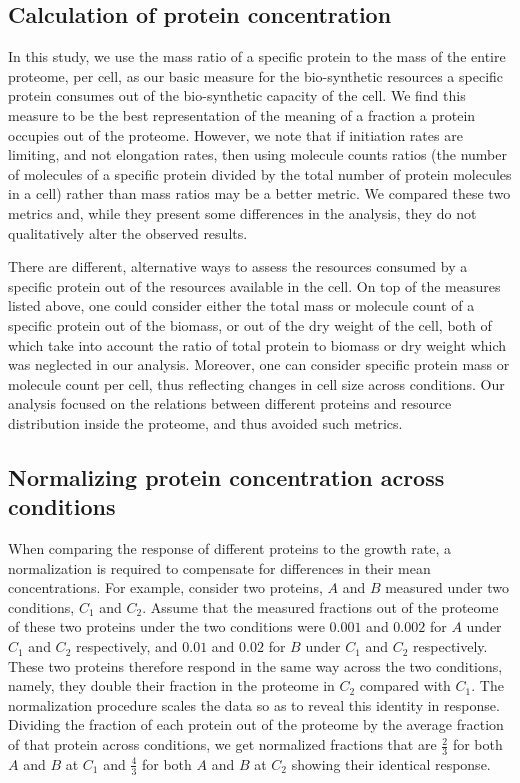 \documentclass[notitlepage]{article}
\begin{document}
\subsection{Calculation of protein concentration}
\label{protconc}
In this study, we use the mass ratio of a specific protein to the mass of the entire proteome, per cell, as our basic measure for the bio-synthetic resources a specific protein consumes out of the bio-synthetic capacity of the cell.
We find this measure to be the best representation of the meaning of a fraction a protein occupies out of the proteome.
However, we note that if initiation rates are limiting, and not elongation rates, then using molecule counts ratios (the number of molecules of a specific protein divided by the total number of protein molecules in a cell) rather than mass ratios may be a better metric.
We compared these two metrics and, while they present some differences in the analysis, they do not qualitatively alter the observed results.

There are different, alternative ways to assess the resources consumed by a specific protein out of the resources available in the cell.
On top of the measures listed above, one could consider either the total mass or molecule count of a specific protein out of the biomass, or out of the dry weight of the cell, both of which take into account the ratio of total protein to biomass or dry weight which was neglected in our analysis.
Moreover, one can consider specific protein mass or molecule count per cell, thus reflecting changes in cell size across conditions.
Our analysis focused on the relations between different proteins and resource distribution inside the proteome, and thus avoided such metrics.
\subsection{Normalizing protein concentration across conditions}
\label{concacrossconds}
When comparing the response of different proteins to the growth rate, a normalization is required to compensate for differences in their mean concentrations.
For example, consider two proteins, $A$ and $B$ measured under two conditions, $C_1$ and $C_2$.
Assume that the measured fractions out of the proteome of these two proteins under the two conditions were $0.001$ and $0.002$ for $A$ under $C_1$ and $C_2$ respectively, and $0.01$ and $0.02$ for $B$ under $C_1$ and $C_2$ respectively.
These two proteins therefore respond in the same way across the two conditions, namely, they double their fraction in the proteome in $C_2$ compared with $C_1$.
The normalization procedure scales the data so as to reveal this identity in response.
Dividing the fraction of each protein out of the proteome by the average fraction of that protein across conditions, we get normalized fractions that are $\frac{2}{3}$ for both $A$ and $B$ at $C_1$ and $\frac{4}{3}$ for both $A$ and $B$ at $C_2$ showing their identical response.
\end{document}
